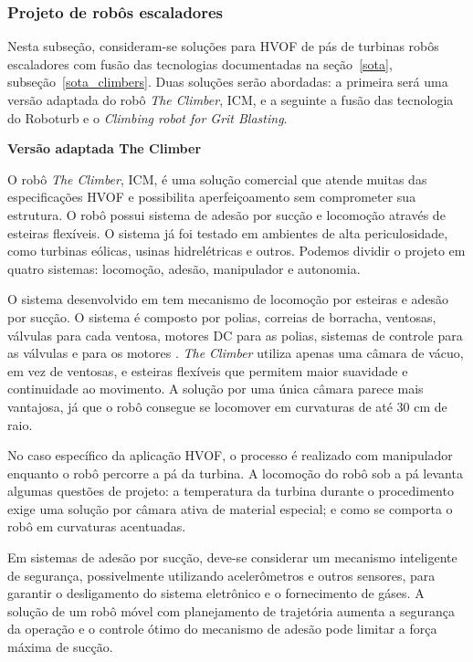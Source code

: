 \subsubsection{Projeto de robôs escaladores}\label{proj_climbers}

Nesta subseção, consideram-se soluções para HVOF de pás de turbinas robôs
escaladores com fusão das tecnologias documentadas na
seção~\ref{sota}, subseção~\ref{sota_climbers}. Duas soluções serão abordadas:
a primeira será uma versão adaptada do robô \emph{The Climber}, ICM, e a
seguinte a fusão das tecnologia do Roboturb e o \emph{Climbing robot for Grit
Blasting}.

\textbf{Versão adaptada The Climber}  

O robô \emph{The Climber}, ICM, é uma solução comercial que atende muitas das
especificações HVOF e possibilita aperfeiçoamento sem comprometer sua
estrutura. O robô possui sistema de adesão por sucção e locomoção através de
esteiras flexíveis. O sistema já foi testado em ambientes de alta
periculosidade, como turbinas eólicas, usinas hidrelétricas e outros. Podemos
dividir o projeto em quatro sistemas: locomoção, adesão, manipulador e autonomia.

O sistema desenvolvido em \cite{kim2008development} tem mecanismo de
locomoção por esteiras e adesão por sucção. O sistema é composto por polias,
correias de borracha, ventosas, válvulas para cada ventosa, motores DC para as polias,
sistemas de controle para as válvulas e para os motores . \emph{The Climber}
utiliza apenas uma câmara de vácuo, em vez de ventosas, e esteiras flexíveis que
permitem maior suavidade e continuidade ao movimento. A solução por uma única
câmara parece mais vantajosa, já que o robô consegue se locomover em curvaturas
de até 30 cm de raio.

No caso específico da aplicação HVOF, o processo é realizado com
manipulador enquanto o robô percorre a pá da turbina. A locomoção do
robô sob a pá levanta algumas questões de projeto: a
temperatura da turbina durante o procedimento exige uma solução por câmara ativa 
de material especial; e como se comporta o robô em curvaturas
acentuadas. 

Em sistemas de adesão por sucção, deve-se considerar um mecanismo
inteligente de segurança, possivelmente utilizando acelerômetros e outros
sensores, para garantir o desligamento do sistema eletrônico e o fornecimento de
gáses. A solução de um robô móvel com planejamento de trajetória aumenta a
segurança da operação e o controle ótimo do mecanismo de adesão pode limitar a força máxima de sucção.

